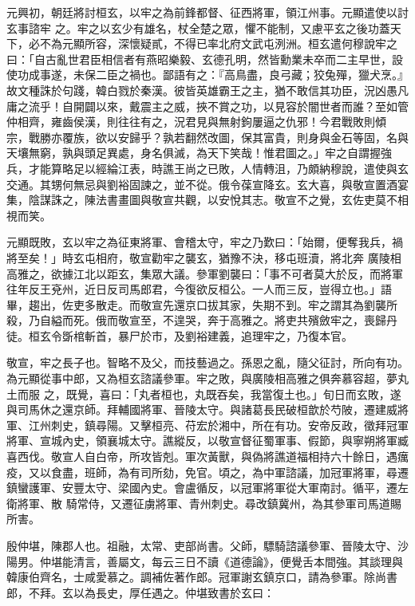 \begin{pinyinscope}
 元興初，朝廷將討桓玄，以牢之為前鋒都督、征西將軍，領江州事。元顯遣使以討玄事諮牢
 之。牢之以玄少有雄名，杖全楚之眾，懼不能制，又慮平玄之後功蓋天下，必不為元顯所容，深懷疑貳，不得已率北府文武屯洌洲。桓玄遣何穆說牢之曰：「自古亂世君臣相信者有燕昭樂毅、玄德孔明，然皆勳業未卒而二主早世，設使功成事遂，未保二臣之禍也。鄙語有之：『高鳥盡，良弓藏；狡兔殫，獵犬烹。』故文種誅於句踐，韓白戮於秦漢。彼皆英雄霸王之主，猶不敢信其功臣，況凶愚凡庸之流乎！自開闢以來，戴震主之威，挾不賞之功，以見容於闇世者而誰？至如管仲相齊，雍齒侯漢，則往往有之，況君見與無射鉤屢逼之仇邪！今君戰敗則傾
 宗，戰勝亦覆族，欲以安歸乎？孰若翻然改圖，保其富貴，則身與金石等固，名與天壤無窮，孰與頭足異處，身名俱滅，為天下笑哉！惟君圖之。」牢之自謂握強兵，才能算略足以經綸江表，時譙王尚之已敗，人情轉沮，乃頗納穆說，遣使與玄交通。其甥何無忌與劉裕固諫之，並不從。俄令葆宣降玄。玄大喜，與敬宣置酒宴集，陰謀誅之，陳法書畫圖與敬宣共觀，以安悅其志。敬宣不之覺，玄佐吏莫不相視而笑。



 元顯既敗，玄以牢之為征東將軍、會稽太守，牢之乃歎曰：「始爾，便奪我兵，禍將至矣！」時玄屯相府，敬宣勸牢之襲玄，猶豫不決，移屯班瀆，將北奔
 廣陵相高雅之，欲據江北以距玄，集眾大議。參軍劉襲曰：「事不可者莫大於反，而將軍往年反王兗州，近日反司馬郎君，今復欲反桓公。一人而三反，豈得立也。」語畢，趨出，佐吏多散走。而敬宣先還京口拔其家，失期不到。牢之謂其為劉襲所殺，乃自縊而死。俄而敬宣至，不遑哭，奔于高雅之。將吏共殯斂牢之，喪歸丹徒。桓玄令斲棺斬首，暴尸於市，及劉裕建義，追理牢之，乃復本官。



 敬宣，牢之長子也。智略不及父，而技藝過之。孫恩之亂，隨父征討，所向有功。為元顯從事中郎，又為桓玄諮議參軍。牢之敗，與廣陵相高雅之俱奔慕容超，夢丸土而服
 之，既覺，喜曰：「丸者桓也，丸既吞矣，我當復土也。」旬日而玄敗，遂與司馬休之還京師。拜輔國將軍、晉陵太守。與諸葛長民破桓歆於芍陂，遷建威將軍、江州刺史，鎮尋陽。又擊桓亮、苻宏於湘中，所在有功。安帝反政，徵拜冠軍將軍、宣城內史，領襄城太守。譙縱反，以敬宣督征蜀軍事、假節，與寧朔將軍臧喜西伐。敬宣人自白帝，所攻皆剋。軍次黃獸，與偽將譙道福相持六十餘日，遇癘疫，又以食盡，班師，為有司所劾，免官。頃之，為中軍諮議，加冠軍將軍，尋遷鎮蠻護軍、安豐太守、梁國內史。會盧循反，以冠軍將軍從大軍南討。循平，遷左衛將軍、散
 騎常侍，又遷征虜將軍、青州刺史。尋改鎮冀州，為其參軍司馬道賜所害。



 殷仲堪，陳郡人也。祖融，太常、吏部尚書。父師，驃騎諮議參軍、晉陵太守、沙陽男。仲堪能清言，善屬文，每云三日不讀《道德論》，便覺舌本間強。其談理與韓康伯齊名，士咸愛慕之。調補佐著作郎。冠軍謝玄鎮京口，請為參軍。除尚書郎，不拜。玄以為長史，厚任遇之。仲堪致書於玄曰：




\end{pinyinscope}
